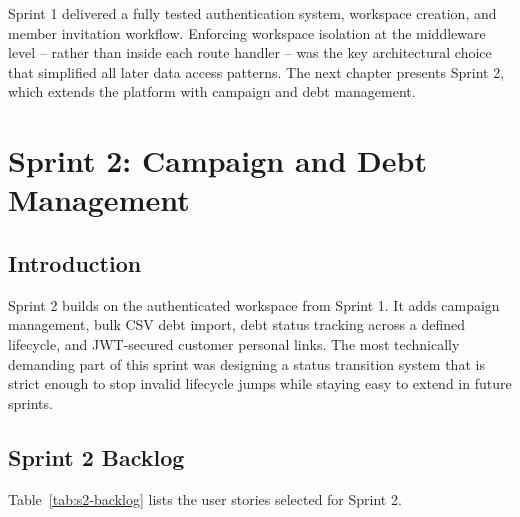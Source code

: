 \documentclass[12pt,a4paper]{report}
\begin{document}
Sprint 1 delivered a fully tested authentication system, workspace creation, and
member invitation workflow.
Enforcing workspace isolation at the middleware level -- rather than inside each
route handler -- was the key architectural choice that simplified all later data
access patterns.
The next chapter presents Sprint 2, which extends the platform with campaign and
debt management.

\chapter{Sprint 2: Campaign and Debt Management}
\label{chap:sprint2}

\section*{Introduction}
{}

Sprint 2 builds on the authenticated workspace from Sprint 1.
It adds campaign management, bulk CSV debt import, debt status tracking across a
defined lifecycle, and JWT-secured customer personal links.
The most technically demanding part of this sprint was designing a status transition
system that is strict enough to stop invalid lifecycle jumps while staying easy to
extend in future sprints.

\section{Sprint 2 Backlog}

Table~\ref{tab:s2-backlog} lists the user stories selected for Sprint 2.
\end{document}

